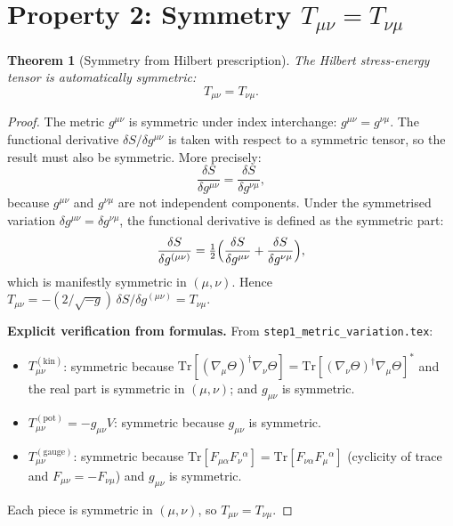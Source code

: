 \documentclass[12pt]{article}
\newtheorem{theorem}[definition]{Theorem}
\newcommand{\Tr}{\mathrm{Tr}}
\begin{document}
\section{Property 2: Symmetry $T_{\mu\nu} = T_{\nu\mu}$}

\begin{theorem}[Symmetry from Hilbert prescription]
\label{thm:symmetry}
The Hilbert stress-energy tensor is automatically symmetric:
\begin{equation}
  T_{\mu\nu} = T_{\nu\mu}.
\end{equation}
\end{theorem}

\begin{proof}
  The metric $g^{\mu\nu}$ is symmetric under index interchange:
  $g^{\mu\nu} = g^{\nu\mu}$.  The functional derivative
  $\delta S/\delta g^{\mu\nu}$ is taken with respect to a symmetric tensor,
  so the result must also be symmetric.  More precisely:
  \begin{equation}
    \frac{\delta S}{\delta g^{\mu\nu}} = \frac{\delta S}{\delta g^{\nu\mu}},
  \end{equation}
  because $g^{\mu\nu}$ and $g^{\nu\mu}$ are not independent components.
  Under the symmetrised variation $\delta g^{\mu\nu} = \delta g^{\nu\mu}$,
  the functional derivative is defined as the symmetric part:
  \begin{equation}
    \frac{\delta S}{\delta g^{(\mu\nu)}}
    = \tfrac{1}{2}\Bigl(\frac{\delta S}{\delta g^{\mu\nu}}
      + \frac{\delta S}{\delta g^{\nu\mu}}\Bigr),
  \end{equation}
  which is manifestly symmetric in $(\mu,\nu)$.
  Hence $T_{\mu\nu} = -(2/\sqrt{-g})\,\delta S/\delta g^{(\mu\nu)}
  = T_{\nu\mu}$.

  \textbf{Explicit verification from formulas.}
  From \texttt{step1\_metric\_variation.tex}:
  \begin{itemize}
    \item $T^{(\mathrm{kin})}_{\mu\nu}$: symmetric because
          $\Tr[(\nabla_\mu\Theta)^\dagger\nabla_\nu\Theta]
          = \Tr[(\nabla_\nu\Theta)^\dagger\nabla_\mu\Theta]^*$
          and the real part is symmetric in $(\mu,\nu)$; and
          $g_{\mu\nu}$ is symmetric.
    \item $T^{(\mathrm{pot})}_{\mu\nu} = -g_{\mu\nu}V$:
          symmetric because $g_{\mu\nu}$ is symmetric.
    \item $T^{(\mathrm{gauge})}_{\mu\nu}$: symmetric because
          $\Tr[F_{\mu\alpha}F_\nu{}^\alpha] = \Tr[F_{\nu\alpha}F_\mu{}^\alpha]$
          (cyclicity of trace and $F_{\mu\nu} = -F_{\nu\mu}$)
          and $g_{\mu\nu}$ is symmetric.
  \end{itemize}
  Each piece is symmetric in $(\mu,\nu)$, so $T_{\mu\nu} = T_{\nu\mu}$.
\end{proof}
\end{document}
